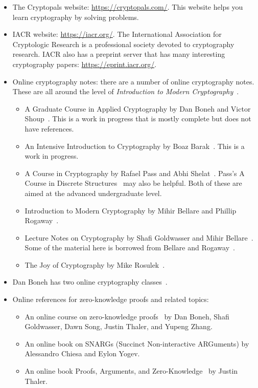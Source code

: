 \begin{itemize}
\item The Cryptopals website: \url{https://cryptopals.com/}.
    This website helps you learn cryptography by solving problems.
\item IACR website: \url{https://iacr.org/}.
    The International Association for Cryptologic Research
    is a professional society devoted to cryptography research.
    IACR also has a preprint server that has many interesting
    cryptography papers: \url{https://eprint.iacr.org/}.
\item Online cryptography notes:
    there are a number of online cryptography notes.
    These are all around the level of
    \emph{Introduction to Modern Cryptography}~\cite{IntroModernCrypto}.

    \begin{itemize}
    \item A Graduate Course in Applied Cryptography
        by Dan Boneh and Victor Shoup~\cite{BonehShoupGraduateApplied}.
        This is a work in progress that is mostly complete
        but does not have references.
    \item An Intensive Introduction to Cryptography
        by Boaz Barak~\cite{IntensiveCrypto}.
        This is a work in progress.
    \item A Course in Cryptography
        by Rafael Pass and Abhi Shelat~\cite{CourseCrypto}.
        Pass's A Course in Discrete Structures~\cite{CourseDiscreteStructures}
        may also be helpful.
        Both of these are aimed at the advanced undergraduate level.
    \item Introduction to Modern Cryptography
        by Mihir Bellare and Phillip Rogaway~\cite{BellareRogawayIMC}.
    \item Lecture Notes on Cryptography
        by Shafi Goldwasser and Mihir Bellare~\cite{GoldwasserBellareLNC}.
        Some of the material here is borrowed from
        Bellare and Rogaway~\cite{BellareRogawayIMC}.
    \item The Joy of Cryptography by Mike Rosulek~\cite{JoyOfCrypto}.
    \end{itemize}
\item Dan Boneh has two online cryptography
    classes~\cite{BonehCourseraCryptoI,BonehCourseraCryptoII}.
\item Online references for zero-knowledge proofs and related topics:
    \begin{itemize}
    \item An online course on zero-knowledge proofs~\cite{OnlineMOOCZKProofs}
        by Dan Boneh, Shafi Goldwasser, Dawn Song, Justin Thaler,
        and Yupeng Zhang.
    \item An online book on SNARGs (Succinct Non-interactive ARGuments)
        \cite{SnargsBook} by Alessandro Chiesa and Eylon Yogev.
    \item An online book Proofs, Arguments,
        and Zero-Knowledge~\cite{ThalerProofsZK} by Justin Thaler.
    \end{itemize}
\end{itemize}

